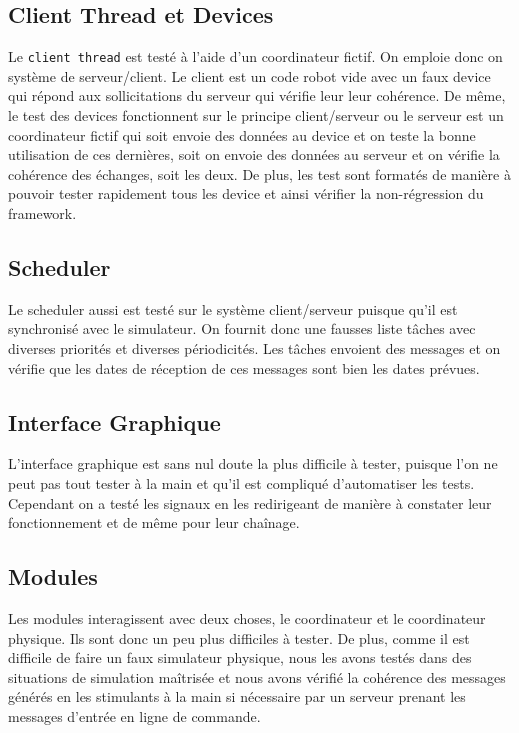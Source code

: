 \label{lestests}
\subsection{Client Thread et Devices}

Le \texttt{client thread} est testé à l'aide d'un coordinateur fictif. On emploie donc on système de serveur/client. Le client est un code robot vide avec un faux device qui répond aux sollicitations du serveur qui vérifie leur leur cohérence. De même, le test des devices fonctionnent sur le principe client/serveur ou le serveur est un coordinateur fictif qui soit envoie des données au device et on teste la bonne utilisation de ces dernières, soit on envoie des données au serveur et on vérifie la cohérence des échanges, soit les deux. De plus, les test sont formatés de manière à pouvoir tester rapidement tous les device et ainsi vérifier la non-régression du framework.
 
\subsection{Scheduler}

Le scheduler aussi est testé sur le système client/serveur puisque qu'il est synchronisé avec le simulateur. On fournit donc une fausses liste tâches avec diverses priorités et diverses périodicités. Les tâches envoient des messages et on vérifie que les dates de réception de ces messages sont bien les dates prévues.


\subsection{Interface Graphique}

L'interface graphique est sans nul doute la plus difficile à tester, puisque l'on ne peut pas tout tester à la main et qu'il est compliqué d'automatiser les tests. Cependant on a testé les signaux en les redirigeant de manière à constater leur fonctionnement et de même pour leur chaînage.

\subsection{Modules}

Les modules interagissent avec deux choses, le coordinateur et le coordinateur physique. Ils sont donc un peu plus difficiles à tester. De plus, comme il est difficile de faire un faux simulateur physique, nous les avons testés dans des situations de simulation maîtrisée et nous avons vérifié la cohérence des messages générés en les stimulants à la main si nécessaire par un serveur prenant les messages d'entrée en ligne de commande.

